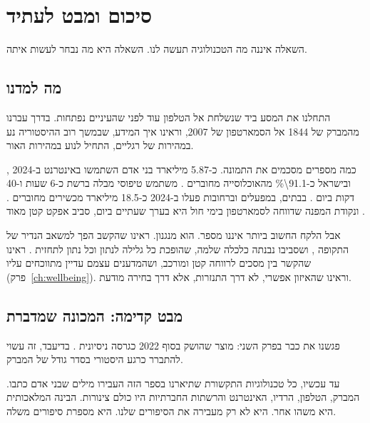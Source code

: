 \chapter{סיכום ומבט לעתיד}

\begin{epigraph}{}
השאלה איננה מה הטכנולוגיה תעשה לנו. השאלה היא מה נבחר לעשות איתה.
\end{epigraph}

\section{מה למדנו}

התחלנו את המסע ביד שנשלחת אל הטלפון עוד לפני שהעיניים נפתחות. בדרך עברנו מהמברק של 1844 אל הסמארטפון של 2007, וראינו איך המידע, שבמשך רוב ההיסטוריה נע במהירות של רגליים, התחיל לנוע במהירות האור.

\begin{sloppypar}
כמה מספרים מסכמים את התמונה. כ-5.87 מיליארד בני אדם השתמשו באינטרנט ב-2024 \parencite{itu2026data}, ובישראל כ-\num{91.1\%} מהאוכלוסייה מחוברים \parencite{kemp2025israel}. משתמש טיפוסי מבלה ברשת כ-6 שעות ו-40 דקות ביום \parencite{kemp2024}. בבתים, במפעלים וברחובות פעלו ב-2024 כ-18.5 מיליארד מכשירים מחוברים \parencite{iotanalytics2025}. ונקודת המפנה שדווחה לסמארטפון בימי חול היא בערך שעתיים ביום, סביב אפקט קטן מאוד \parencite{oii2017press,przybylski2017,orben2019}.
\end{sloppypar}

אבל הלקח החשוב ביותר איננו מספר. הוא מנגנון. ראינו שהקשב הפך למשאב הנדיר של התקופה \parencite{simon1971}, ושסביבו נבנתה כלכלה שלמה, שהופכת כל גלילה לנתון וכל נתון לתחזית \parencite{zuboff2019}. ראינו שהקשר בין מסכים לרווחה קטן ומורכב, ושהמדענים עצמם עדיין מתווכחים עליו (פרק~\ref{ch:wellbeing}). וראינו שהאיזון אפשרי, לא דרך התנזרות, אלא דרך בחירה מודעת.

\section{מבט קדימה: המכונה שמדברת}

פגשנו את  כבר בפרק השני: מוצר שהושק בסוף 2022 כגרסה ניסיונית \parencite{openai2022}. בדיעבד, זה עשוי להתברר כרגע היסטורי בסדר גודל של המברק.

עד עכשיו, כל טכנולוגיות התקשורת שתיארנו בספר הזה העבירו מילים שבני אדם כתבו. המברק, הטלפון, הרדיו, האינטרנט והרשתות החברתיות היו כולם צינורות. הבינה המלאכותית היא משהו אחר. היא לא רק מעבירה את הסיפורים שלנו. היא מספרת סיפורים משלה.

